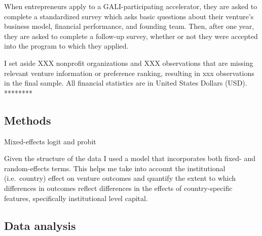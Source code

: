\documentclass[
  english,
  man]{apa6}
\begin{document}
When entrepreneurs apply to a GALI-participating accelerator, they are asked to complete a standardized survey which asks basic questions about their venture's business model, financial performance, and founding team. Then, after one year, they are asked to complete a follow-up survey, whether or not they were accepted into the program to which they applied.

I set aside XXX nonprofit organizations and XXX observations that are missing relevant venture information or preference ranking, resulting in xxx observations in the final sample. All financial statistics are in United States Dollars (USD). ********

\hypertarget{methods}{%
\subsection{Methods}\label{methods}}

Mixed-effects logit and probit

Given the structure of the data I used a model that incorporates both fixed- and random-effects terms. This helps me take into account the institutional (i.e.~country) effect on venture outcomes and quantify the extent to which differences in outcomes reflect differences in the effects of country-specific features, specifically institutional level capital.

\hypertarget{data-analysis}{%
\subsection{Data analysis}\label{data-analysis}}
\end{document}
